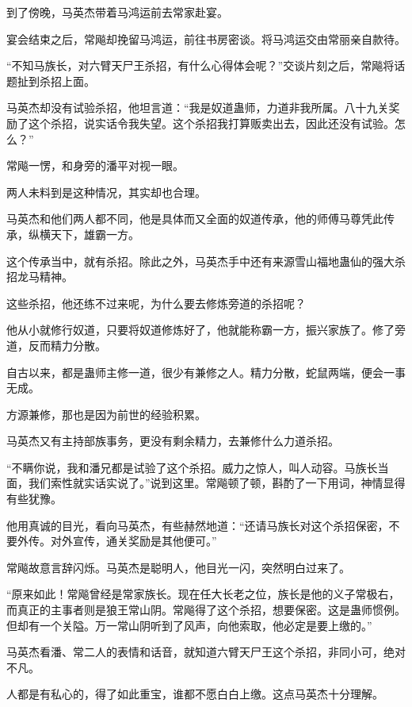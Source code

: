 
\begin{this_body}



到了傍晚，马英杰带着马鸿运前去常家赴宴。

宴会结束之后，常飚却挽留马鸿运，前往书房密谈。将马鸿运交由常丽亲自款待。

“不知马族长，对六臂天尸王杀招，有什么心得体会呢？”交谈片刻之后，常飚将话题扯到杀招上面。

马英杰却没有试验杀招，他坦言道：“我是奴道蛊师，力道非我所属。八十九关奖励了这个杀招，说实话令我失望。这个杀招我打算贩卖出去，因此还没有试验。怎么？”

常飚一愣，和身旁的潘平对视一眼。

两人未料到是这种情况，其实却也合理。

马英杰和他们两人都不同，他是具体而又全面的奴道传承，他的师傅马尊凭此传承，纵横天下，雄霸一方。

这个传承当中，就有杀招。除此之外，马英杰手中还有来源雪山福地蛊仙的强大杀招龙马精神。

这些杀招，他还练不过来呢，为什么要去修炼旁道的杀招呢？

他从小就修行奴道，只要将奴道修炼好了，他就能称霸一方，振兴家族了。修了旁道，反而精力分散。

自古以来，都是蛊师主修一道，很少有兼修之人。精力分散，蛇鼠两端，便会一事无成。

方源兼修，那也是因为前世的经验积累。

马英杰又有主持部族事务，更没有剩余精力，去兼修什么力道杀招。

“不瞒你说，我和潘兄都是试验了这个杀招。威力之惊人，叫人动容。马族长当面，我们索性就实话实说了。”说到这里。常飚顿了顿，斟酌了一下用词，神情显得有些犹豫。

他用真诚的目光，看向马英杰，有些赫然地道：“还请马族长对这个杀招保密，不要外传。对外宣传，通关奖励是其他便可。”

常飚故意言辞闪烁。马英杰是聪明人，他目光一闪，突然明白过来了。

“原来如此！常飚曾经是常家族长。现在任大长老之位，族长是他的义子常极右，而真正的主事者则是狼王常山阴。常飚得了这个杀招，想要保密。这是蛊师惯例。但却有一个关隘。万一常山阴听到了风声，向他索取，他必定是要上缴的。”

马英杰看潘、常二人的表情和话音，就知道六臂天尸王这个杀招，非同小可，绝对不凡。

人都是有私心的，得了如此重宝，谁都不愿白白上缴。这点马英杰十分理解。


\end{this_body}
